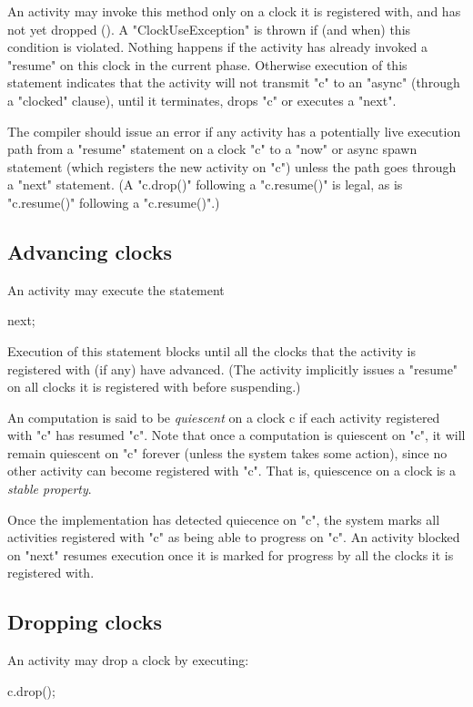 An activity may invoke this method only on a clock it is registered
with, and has not yet dropped (). A \xcd"ClockUseException" is thrown if (and
when) this condition is violated.  Nothing happens if the activity has
already invoked a \xcd"resume" on this clock in the current phase.
Otherwise execution of this statement indicates that the activity will
not transmit \xcd"c" to an \xcd"async" (through a \xcd"clocked"
clause),
until it terminates, drops \xcd"c" or executes a \xcd"next". 

\begin{staticrule*}
The compiler should issue an error if any activity has a potentially
live execution path from a \xcd"resume" statement on a clock \xcd"c"
to a \xcd"now" or async spawn statement (which registers the new
activity on \xcd"c") unless the path goes through a \xcd"next"
statement. (A \xcd"c.drop()" following a \xcd"c.resume()" is legal,
as is \xcd"c.resume()" following a \xcd"c.resume()".)
\end{staticrule*}

\subsection{Advancing clocks}\label{sec:clock:next}
An activity may execute the statement
\begin{xten}
next;
\end{xten}

\noindent 
Execution of this statement blocks until all the clocks that the
activity is registered with (if any) have advanced. (The activity
implicitly issues a \xcd"resume" on all clocks it is registered
with before suspending.)

An \Xten{} computation is said to be {\em quiescent} on a clock {\cf
c} if each activity registered with \xcd"c" has resumed \xcd"c".
Note that once a computation is quiescent on \xcd"c", it will remain
quiescent on \xcd"c" forever (unless the system takes some action),
since no other activity can become registered with \xcd"c".  That is,
quiescence on a clock is a {\em stable property}.

Once the implementation has detected quiecence on \xcd"c", the system
marks all activities registered with \xcd"c" as being able to progress
on \xcd"c". An activity blocked on \xcd"next" resumes execution once
it is marked for progress by all the clocks it is registered with.

\subsection{Dropping clocks}\label{sec:clock:drop}
An activity may drop a clock by executing:
\begin{xten}
c.drop();
\end{xten}


